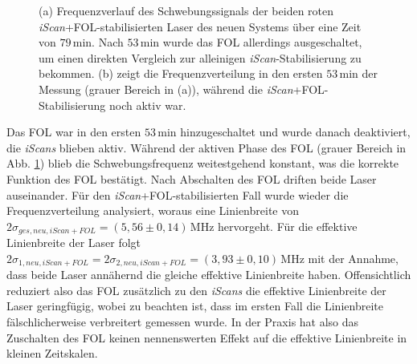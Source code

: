 \begin{figure}[hp]
 	\centering
 	\footnotesize
 	\fbox{\parbox{\dimexpr \linewidth - 2\fboxrule - 2\fboxsep}{
 	\subfloat[]{
		\label{subfig:beatfrequenzen_neu_iScan+FOL_drift}
		
		}\\
 	\subfloat[]{
		\label{subfig:beatfrequenzen_neu_iScan+FOL_histogramm}
		
		}
	}}
	\caption[Schwebungsfrequenzen - neues System mit \textit{iScan}+FOL]{(a)
	Frequenzverlauf des Schwebungssignals der beiden roten
	\textit{iScan}+FOL-stabilisierten Laser des neuen Systems über eine Zeit von
	$79\,$min. Nach $53\,$min wurde das FOL allerdings ausgeschaltet, um
	einen direkten Vergleich zur alleinigen \textit{iScan}-Stabilisierung zu
	bekommen. (b) zeigt die Frequenzverteilung in den ersten $53\,$min der Messung
	(grauer Bereich in (a)), während die \textit{iScan}+FOL-Stabilisierung noch
	aktiv war.}
	\label{fig:beatfrequenzen_neu_iScan+FOL}
\end{figure}
Das FOL war in den ersten $53\,$min hinzugeschaltet und wurde danach
deaktiviert, die \textit{iScans} blieben aktiv. Während der aktiven Phase des
FOL (grauer Bereich in Abb.
\ref{fig:beatfrequenzen_neu_iScan+FOL})
blieb die Schwebungsfrequenz weitestgehend konstant, was die korrekte Funktion des FOL bestätigt. Nach
Abschalten des FOL driften beide Laser auseinander. Für den
\textit{iScan}+FOL-stabilisierten Fall wurde wieder die Frequenzverteilung
analysiert, woraus eine Linienbreite von
$2\sigma_{ges,neu,iScan+FOL}=(5,56\pm0,14)\,$MHz hervorgeht. Für die effektive
Linienbreite der Laser folgt
$2\sigma_{1,neu,iScan+FOL}=2\sigma_{2,neu,iScan+FOL}=(3,93\pm0,10)\,$MHz mit
der Annahme, dass beide Laser annähernd die gleiche effektive Linienbreite haben.
Offensichtlich reduziert also das FOL zusätzlich zu den \textit{iScans} die
effektive Linienbreite der Laser geringfügig, wobei zu beachten ist, dass im
ersten Fall die Linienbreite fälschlicherweise verbreitert gemessen wurde. In der
Praxis hat also das Zuschalten des FOL keinen nennenswerten Effekt auf die
effektive Linienbreite in kleinen Zeitskalen.

